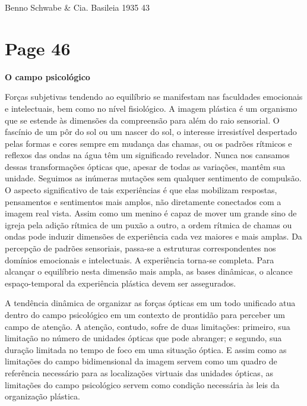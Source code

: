 \documentclass[a4paper]{article}
\begin{document}
\vspace*{\fill} %

\raggedright
Benno Schwabe \& Cia. Basileia 1935%
\hfill
43
\par

\newpage
\section*{Page 46}

\centering
\textbf{\large O campo psicológico}
\par
\noindent Forças subjetivas tendendo ao equilíbrio se manifestam nas faculdades emocionais e intelectuais, bem como no nível fisiológico. A imagem plástica é um organismo que se estende às dimensões da compreensão para além do raio sensorial. O fascínio de um pôr do sol ou um nascer do sol, o interesse irresistível despertado pelas formas e cores sempre em mudança das chamas, ou os padrões rítmicos e reflexos das ondas na água têm um significado revelador. Nunca nos cansamos dessas transformações ópticas que, apesar de todas as variações, mantêm sua unidade. Seguimos as inúmeras mutações sem qualquer sentimento de compulsão. O aspecto significativo de tais experiências é que elas mobilizam respostas, pensamentos e sentimentos mais amplos, não diretamente conectados com a imagem real vista. Assim como um menino é capaz de mover um grande sino de igreja pela adição rítmica de um puxão a outro, a ordem rítmica de chamas ou ondas pode induzir dimensões de experiência cada vez maiores e mais amplas. Da percepção de padrões sensoriais, passa-se a estruturas correspondentes nos domínios emocionais e intelectuais. A experiência torna-se completa. Para alcançar o equilíbrio nesta dimensão mais ampla, as bases dinâmicas, o alcance espaço-temporal da experiência plástica devem ser assegurados.

A tendência dinâmica de organizar as forças ópticas em um todo unificado atua dentro do campo psicológico em um contexto de prontidão para perceber um campo de atenção. A atenção, contudo, sofre de duas limitações: primeiro, sua limitação no número de unidades ópticas que pode abranger; e segundo, sua duração limitada no tempo de foco em uma situação óptica. E assim como as limitações do campo bidimensional da imagem servem como um quadro de referência necessário para as localizações virtuais das unidades ópticas, as limitações do campo psicológico servem como condição necessária às leis da organização plástica.
\end{document}
